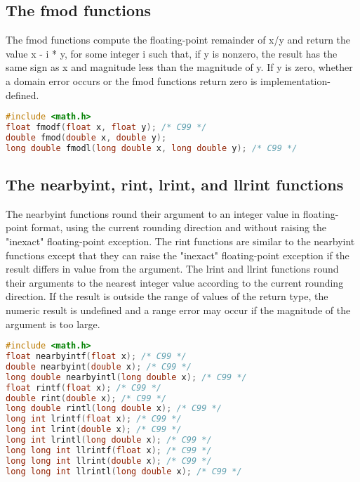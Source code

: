 \subsection{The fmod functions}
The fmod functions compute the floating-point remainder of x/y and return the
value x - i * y, for some integer i such that, if y is nonzero, the result has
the same sign as x and magnitude less than the magnitude of y. If y is zero,
whether a domain error occurs or the fmod functions return zero is
implementation-defined.
\lstset{basicstyle=\scriptsize, numbers=left, captionpos=b, tabsize=4}
\begin{lstlisting}[caption=Section \thesection listing \arabic{furthermathcnt},language={C},
breaklines=true,xleftmargin=15pt,label=lst:section\thesection listing\arabic{furthermathcnt}]
#include <math.h>
float fmodf(float x, float y); /* C99 */
double fmod(double x, double y);
long double fmodl(long double x, long double y); /* C99 */
\end{lstlisting}

\subsection{The nearbyint, rint, lrint, and llrint functions}
The nearbyint functions round their argument to an integer value in
floating-point format, using the current rounding direction and without raising
the "inexact" floating-point exception.  The rint functions are similar to the
nearbyint functions except that they can raise the "inexact" floating-point
exception if the result differs in value from the argument.  The lrint and
llrint functions round their arguments to the nearest integer value according
to the current rounding direction. If the result is outside the range of values
of the return type, the numeric result is undefined and a range error may occur
if the magnitude of the argument is too large.
\lstset{basicstyle=\scriptsize, numbers=left, captionpos=b, tabsize=4}
\begin{lstlisting}[caption=Section \thesection listing \arabic{furthermathcnt},language={C},
breaklines=true,xleftmargin=15pt,label=lst:section\thesection listing\arabic{furthermathcnt}]
#include <math.h>
float nearbyintf(float x); /* C99 */
double nearbyint(double x); /* C99 */
long double nearbyintl(long double x); /* C99 */
float rintf(float x); /* C99 */
double rint(double x); /* C99 */
long double rintl(long double x); /* C99 */
long int lrintf(float x); /* C99 */
long int lrint(double x); /* C99 */
long int lrintl(long double x); /* C99 */
long long int llrintf(float x); /* C99 */
long long int llrint(double x); /* C99 */
long long int llrintl(long double x); /* C99 */
\end{lstlisting}

